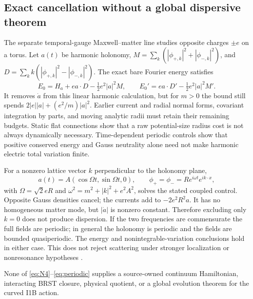 \subsection{Exact cancellation without a global dispersive theorem}
The separate temporal-gauge Maxwell--matter line studies opposite charges
$\pm e$ on a torus. Let $a(t)$ be harmonic holonomy,
$M=\sum_k(|\phi_{+,k}|^2+|\phi_{-,k}|^2)$, and
$D=\sum_k k(|\phi_{+,k}|^2-|\phi_{-,k}|^2)$.
The exact bare Fourier energy satisfies
\begin{equation}
 E_0=H_a+ea\cdot D-\tfrac12e^2|a|^2M,\qquad
 E_0'=ea\cdot D'-\tfrac12e^2|a|^2M'.\label{eq:bareenergy}
\end{equation}
It removes $\dot a$ from this linear harmonic calculation, but for $m>0$
the bound still spends $2|e||a|+(e^2/m)|a|^2$.
Earlier current and radial normal forms, covariant integration by parts,
and moving analytic radii must retain their remaining budgets.
Static flat connections show that a raw potential-size radius cost is
not always dynamically necessary. Time-dependent periodic controls show
that positive conserved energy and Gauss neutrality alone need not make
harmonic electric total variation finite.

For a nonzero lattice vector $k$ perpendicular to the holonomy plane,
\begin{equation}
 a(t)=A(\cos\Omega t,\sin\Omega t,0),\qquad
 \phi_+=\phi_-=R e^{i\omega t}e^{ik\cdot x},\label{eq:periodic}
\end{equation}
with $\Omega=\sqrt2eR$ and
$\omega^2=m^2+|k|^2+e^2A^2$, solves the stated coupled control.
Opposite Gauss densities cancel; the currents add to $-2e^2R^2a$.
It has no homogeneous matter mode, but $|\dot a|$ is nonzero constant.
Therefore excluding only $k=0$ does not produce dispersion. If the two
frequencies are commensurate the full fields are periodic; in general
the holonomy is periodic and the fields are bounded quasiperiodic.
The energy and nonintegrable-variation conclusions hold in either case.
This does not reject scattering under stronger localization or
nonresonance hypotheses \cite{MixtureControl}.

None of \eqref{eq:N4}--\eqref{eq:periodic} supplies a source-owned
continuum Hamiltonian, interacting BRST closure, physical quotient,
or a global evolution theorem for the curved I1B action.
